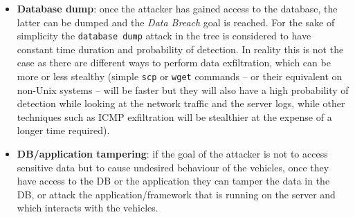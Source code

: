 \begin{itemize}
	\item \textbf{Database dump}: once the attacker has gained access to the database, the latter can be dumped and the \textit{Data Breach} goal is reached. For the sake of simplicity the \texttt{database dump} attack in the tree is considered to have constant time duration and probability of detection. In reality this is not the case as there are different ways to perform data exfiltration, which can be more or less stealthy (simple \texttt{scp} or \texttt{wget} commands -- or their equivalent on non-Unix systems -- will be faster but they will also have a high probability of detection while looking at the network traffic and the server logs, while other techniques such as ICMP exfiltration will be stealthier at the expense of a longer time required).
	\item \textbf{DB/application tampering}: if the goal of the attacker is not to access sensitive data but to cause undesired behaviour of the vehicles, once they have access to the DB or the application they can tamper the data in the DB, or attack the application/framework that is running on the server and which interacts with the vehicles.
\end{itemize}
